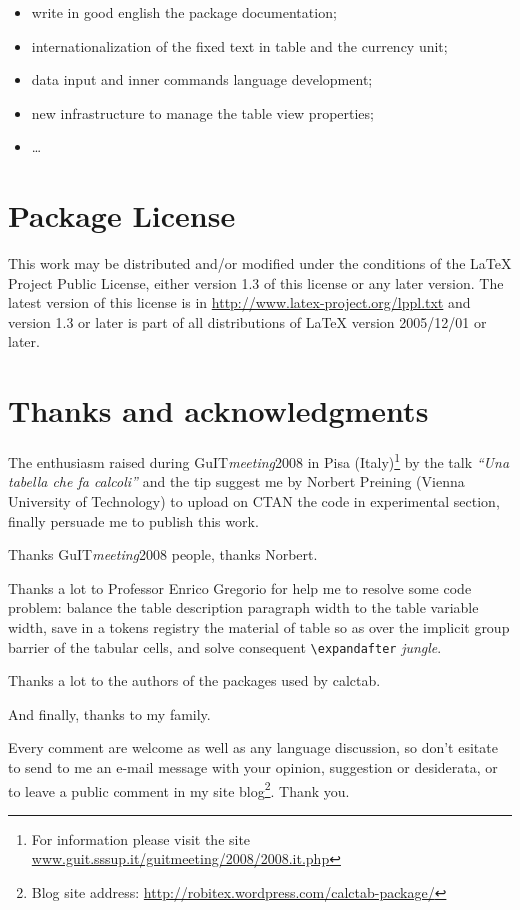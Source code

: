 \documentclass[a4paper]{article}
\newcommand{\pkg}[1]{\textsf{#1}}
\begin{document}
\begin{itemize}
    \item write in good english the package documentation;
    \item internationalization of the fixed text in table and the currency unit;
    \item data input and inner commands language development;
    \item new infrastructure to manage the table view properties;
    \item \dots
\end{itemize}

\section{Package License}
This work may be distributed and/or modified under the
conditions of the \LaTeX{} Project Public License, either version 1.3
of this license or any later version.
The latest version of this license is in
\url{http://www.latex-project.org/lppl.txt}
and version 1.3 or later is part of all distributions of \LaTeX{}
version 2005/12/01 or later.


\section{Thanks and acknowledgments}

The enthusiasm raised during GuIT\emph{meeting}2008 in Pisa (Italy)\footnote{For information please visit the site \url{www.guit.sssup.it/guitmeeting/2008/2008.it.php}} by the talk \emph{``Una tabella che fa calcoli''} and the tip suggest me by Norbert Preining (Vienna University of Technology) to upload on CTAN the code in experimental section, finally persuade me to publish this work.

Thanks GuIT\emph{meeting}2008 people, thanks Norbert.

Thanks a lot to Professor Enrico Gregorio for help me to resolve some code problem: balance the table description paragraph width to the table variable width, save in a tokens registry the material of table so as over the implicit group barrier of the tabular cells, and solve consequent \verb=\expandafter= \emph{jungle}.

Thanks a lot to the authors of the packages used by \pkg{calctab}.

And finally, thanks to my family.

Every comment are welcome as well as any language discussion, so don't esitate to send to me an e-mail message with your opinion, suggestion or desiderata, or to leave a public comment in my site blog\footnote{Blog site address: \url{http://robitex.wordpress.com/calctab-package/}}. Thank you.
\end{document}
